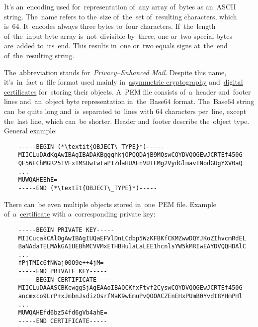 \label{multitasking}

\label{concurrency}

\label{loosetightcoupling}

\label{base64}
It's an~encoding used for~representation of~any array of~bytes as an~ASCII string.
The~name refers to the~size of~the~set of~resulting characters, which is~64.
It~encodes always three bytes to~four characters.
If~the~length of~the~input byte array is~not~divisible by~three, one or~two special bytes are~added to~its~end.
This results in~one or~two equals signs at~the~end of~the~resulting string.

\label{pem}
The~abbreviation stands for~\textit{Privacy--Enhanced Mail}.
Despite this name, it's~in~fact a~file format used mainly in~\hyperref[asymmetriccryptography]{asymmetric cryptography} and~\hyperref[certificate]{digital certificates} for~storing their objects.
A~PEM file consists of~a~header and~footer lines and~an~object byte representation in~the~Base64 format.
The~Base64 string can~be quite long and~is~separated to~lines with 64 characters per~line, except the~last line, which can~be shorter.
Header and~footer describe the~object type.
General example:
\begin{lstlisting}
    -----BEGIN (*\textit{OBJECT\_TYPE}*)-----
    MIICLuDAdKgAwIBAgIBADAKBggqhkjOPQQDAjB9MQswCQYDVQQGEwJCRTEf450G
    QE56EChMGR251VExTMSUwIwtaPIZdaHUAEnVUTFMg2VydGlmavINodGUgYXV0aQ
    ...
    MUWQAHEEhE=
    -----END (*\textit{OBJECT\_TYPE}*)-----
\end{lstlisting}

\noindent There can~be even multiple objects stored in~one~PEM file.
Example of~a~\hyperref[certificate]{certificate} with a~corresponding private key:
\begin{lstlisting}
    -----BEGIN PRIVATE KEY-----
    MIICucakCAlOgAwIBAgIUQaEFVlDnLCdbp5WzKFBKfCKMZwwDQYJKoZIhvcmRdEL
    BaNAdaTELMAkGA1UEBhMCVVMxETHBHulaLaLEE1hcnlsYW5kMRIwEAYDVQQHDAlC
    ...
    fPjTMIc6fNWaj00O9e++4jM=
    -----END PRIVATE KEY-----
    -----BEGIN CERTIFICATE-----
    MIICLuDAAASCBKcwggSjAgEAAoIBAQCKfxFtvf2CyswCQYDVQQGEwJCRTEf450G
    ancmxco9LrP+xJmbnJsdizOsrfMaK9wEmuPvQOOACZEnEHxPUmB0Yvdt8YHmPHl
    ...
    MUWQAHEfd6bz54fd6gVb4ahE=
    -----END CERTIFICATE-----
\end{lstlisting}

